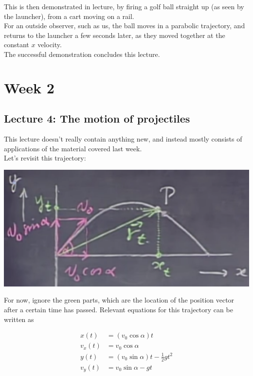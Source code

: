 \documentclass[12pt,a4paper]{report}
\begin{document}
This is then demonstrated in lecture, by firing a golf ball straight up (as seen by the launcher), from a cart moving on a rail.\\
For an outside observer, such as us, the ball moves in a parabolic trajectory, and returns to the launcher a few seconds later, as they moved together at the constant $x$ velocity.\\
The successful demonstration concludes this lecture.

\chapter{Week 2}

\section{Lecture 4: The motion of projectiles}

This lecture doesn't really contain anything new, and instead mostly consists of applications of the material covered last week.\\
Let's revisit this trajectory:

\begin{center}
\includegraphics[scale=0.65]{Graphics/2d-motion-decomposed}
\end{center}

For now, ignore the green parts, which are the location of the position vector after a certain time has passed.
Relevant equations for this trajectory can be written as

\begin{align}
x(t) &= (v_0 \cos \alpha) t \label{eq:lec3_x}\\
v_x(t) &= v_0 \cos \alpha\\
y(t) &= (v_0 \sin \alpha) t - \frac{1}{2} g t^2 \label{eq:lec3_y}\\
v_y(t) &= v_0 \sin \alpha - g t
\end{align}
\end{document}
